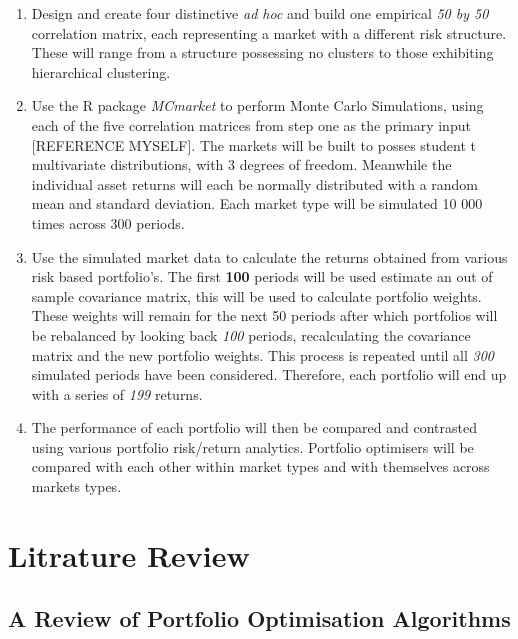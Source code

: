 \documentclass[11pt,preprint, authoryear]{elsarticle}
\numberwithin{equation}{section}
\numberwithin{figure}{section}
\numberwithin{table}{section}
\begin{document}
\begin{enumerate}
\def\labelenumi{\arabic{enumi}.}
\item
  Design and create four distinctive \emph{ad hoc} and build one
  empirical \emph{50 by 50} correlation matrix, each representing a
  market with a different risk structure. These will range from a
  structure possessing no clusters to those exhibiting hierarchical
  clustering.
\item
  Use the R package \emph{MCmarket} to perform Monte Carlo Simulations,
  using each of the five correlation matrices from step one as the
  primary input {[}REFERENCE MYSELF{]}. The markets will be built to
  posses student t multivariate distributions, with 3 degrees of
  freedom. Meanwhile the individual asset returns will each be normally
  distributed with a random mean and standard deviation. Each market
  type will be simulated 10 000 times across 300 periods.
\item
  Use the simulated market data to calculate the returns obtained from
  various risk based portfolio's. The first \textbf{100} periods will be
  used estimate an out of sample covariance matrix, this will be used to
  calculate portfolio weights. These weights will remain for the next 50
  periods after which portfolios will be rebalanced by looking back
  \emph{100} periods, recalculating the covariance matrix and the new
  portfolio weights. This process is repeated until all \emph{300}
  simulated periods have been considered. Therefore, each portfolio will
  end up with a series of \emph{199} returns.
\item
  The performance of each portfolio will then be compared and contrasted
  using various portfolio risk/return analytics. Portfolio optimisers
  will be compared with each other within market types and with
  themselves across markets types.
\end{enumerate}

\hypertarget{litrature-review}{%
\section{Litrature Review}\label{litrature-review}}

\hypertarget{a-review-of-portfolio-optimisation-algorithms}{%
\subsection{A Review of Portfolio Optimisation
Algorithms}\label{a-review-of-portfolio-optimisation-algorithms}}
\end{document}
